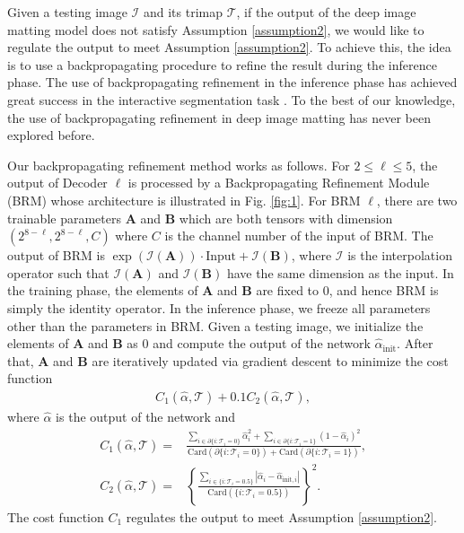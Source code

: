 \documentclass{article}
\newcommand{\BA}{\mathbf{A}}    \newcommand{\BB}{\mathbf{B}}    \newcommand{\BC}{\mathbf{C}}    \newcommand{\BD}{\mathbf{D}}    \newcommand{\BE}{\mathbf{E}}    \newcommand{\BF}{\mathbf{F}}    \newcommand{\BG}{\mathbf{G}}    \newcommand{\BH}{\mathbf{H}}    \newcommand{\BI}{\mathbf{I}}    \newcommand{\BJ}{\mathbf{J}}    \newcommand{\BK}{\mathbf{K}}    \newcommand{\BL}{\mathbf{L}}
\theoremstyle{plain}
\begin{document}
Given a testing image $\mathcal I$ and its trimap $\mathcal T$,
if the output of the deep image matting model does not satisfy Assumption \ref{assumption2},
we would like to regulate the output to meet Assumption \ref{assumption2}.
To achieve this,
the idea is to use a backpropagating procedure to refine the result during the inference phase.
The use of backpropagating refinement in the inference phase
has achieved great success in the interactive segmentation task \cite{Jang2019Interactive,Sofiiuk2020Rethinking}.
To the best of our knowledge, 
the use of backpropagating refinement in deep image matting has never been explored before.

Our backpropagating refinement method works as follows.
For $2 \leq \ell \leq 5$,
the output of Decoder $\ell$ is processed by a Backpropagating Refinement Module (BRM)
whose
architecture is illustrated in Fig. \ref{fig:1}.
For BRM $\ell$, there are two trainable parameters $\BA$ and $\BB$ which are both tensors with dimension $(2^{8-\ell}, 2^{8-\ell}, C)$ where $C$ is the channel number of the input of BRM.
The output of BRM is $\exp( \mathscr I(\BA))\cdot \textrm{Input} + \mathscr I(\BB)$,
where  $\mathscr I$ is the interpolation operator such that $\mathscr I(\BA)$ and $\mathscr I(\BB)$ have the same dimension as the input.
In the training phase, the elements of $\BA$ and $\BB$ are fixed to $0$, and hence BRM is simply the identity operator.
In the inference phase,
we freeze all parameters other than the parameters in BRM.
Given a testing image,
we initialize the elements of $\BA$ and $\BB$ as $0$
and compute the output of the network $\hat \alpha_{\mathrm{init}}$.
After that, $\BA$ and $\BB$ are iteratively updated 
via gradient descent
to minimize the cost function
{\small
    \begin{align*}C_1(\hat \alpha, \mathcal T)
    +
    0.1
    C_2(\hat \alpha, \mathcal T)
,
\end{align*}
}where $\hat \alpha$ is the output of the network and 
{\small
    \begin{align*}
        C_1(\hat \alpha, \mathcal T)
        =&
        \frac{
            \sum_{i \in \partial\{i: \mathcal T_i = 0\} } \hat \alpha_i^2
            +
            \sum_{i \in \partial\{i: \mathcal T_i = 1\} } (1-\hat \alpha_i)^2
        }
        {
            \mathrm{Card}(\partial\{i: \mathcal T_i = 0\})
            +
            \mathrm{Card}(\partial\{i: \mathcal T_i = 1\})
        }
        ,
        \\
        C_2(\hat \alpha, \mathcal T)
        =&
        \left\{
        \frac{
            \sum_{i \in \{i: \mathcal T_i = 0.5 \}}|\hat \alpha_i - \hat \alpha_{\text{init},i} |
            }{
            \mathrm{Card}(\{i: \mathcal T_i = 0.5 \})
        }
        \right\}^2
        .
    \end{align*}
}The cost function $C_1$ regulates the output to meet Assumption \ref{assumption2}.
\end{document}
